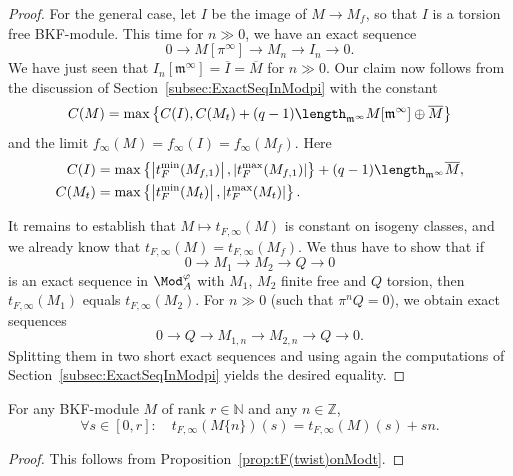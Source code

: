 \begin{proof}
For the general case, let $I$ be the image of $M\rightarrow M_{f}$, so that $I$ is a torsion free BKF-module. This time for $n\gg0$, we have an exact sequence
\[
0\rightarrow M[\pi^{\infty}]\rightarrow M_{n}\rightarrow I_{n}\rightarrow0.
\]
We have just seen that $I_{n}[\mathfrak{m}^{\infty}]=\overline{I}=\overline{M}$ for $n\gg0$. Our claim now follows from the discussion of Section~\ref{subsec:ExactSeqInModpi} with the constant
\[
C(M)=\max\left\{ C(I),C(M_{t})+(q-1)\length_{\mathfrak{m}^{\infty}}M[\mathfrak{m}^{\infty}]\oplus\overline{M}\right\}
\]
and the limit $f_{\infty}(M)=f_{\infty}(I)=f_{\infty}(M_{f})$. Here
\begin{align*}
C(I) & = \max\left\{ \left|t_{F}^{\min}(M_{f,1})\right|,\left|t_{F}^{\max}(M_{f,1})\right|\right\} +(q-1)\length_{\mathfrak{m}^{\infty}}\overline{M},\\
C(M_{t}) & = \max\left\{ \left|t_{F}^{\min}(M_{t})\right|,\left|t_{F}^{\max}(M_{t})\right|\right\}.
\end{align*}

It remains to establish that $M\mapsto t_{F,\infty}(M)$ is constant on isogeny classes, and we already know that $t_{F,\infty}(M)=t_{F,\infty}(M_{f})$. We thus have to show that if
\[
0\rightarrow M_{1}\rightarrow M_{2}\rightarrow Q\rightarrow0
\]
is an exact sequence in $\Mod_{A}^{\varphi}$ with $M_{1}$, $M_{2}$ finite free and $Q$ torsion, then $t_{F,\infty}(M_{1})$ equals $t_{F,\infty}(M_{2})$. For $n\gg0$ (such that $\pi^{n}Q=0$), we obtain exact sequences
\[
0\rightarrow Q\rightarrow M_{1,n}\rightarrow M_{2,n}\rightarrow Q\rightarrow0.
\]
Splitting them in two short exact sequences and using again the computations of Section~\ref{subsec:ExactSeqInModpi} yields the desired equality.
\end{proof}

\begin{prop}\label{prop:tFinfty(twist)onMod*}
For any BKF-module $M$ of rank $r\in\mathbb{N}$ and any $n\in\mathbb{Z}$,
\[
\forall s\in[0,r]:\quad t_{F,\infty}(M\{n\})(s)=t_{F,\infty}(M)(s)+sn.
\]
\end{prop}

\begin{proof}
This follows from Proposition~\ref{prop:tF(twist)onModt}.
\end{proof}

\subsubsection{}\label{subsec:TypeHN}

